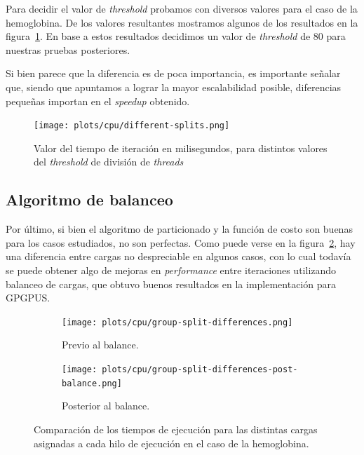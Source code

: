Para decidir el valor de \textit{threshold} probamos con diversos valores para
el caso de la hemoglobina. De los valores resultantes mostramos algunos de los
resultados en la figura~\ref{fig:split-hemo}. En base a estos resultados decidimos
un valor de \textit{threshold} de 80 para nuestras pruebas posteriores.

Si bien parece que la diferencia es de poca importancia, es importante se\~nalar
que, siendo que apuntamos a lograr la mayor escalabilidad posible, diferencias
peque\~nas importan en el \textit{speedup} obtenido.

\begin{figure}[htbp]
   \centering
   \texttt{[image: plots/cpu/different-splits.png]}
   \caption{Valor del tiempo de iteraci\'on en milisegundos, para distintos
   valores del \textit{threshold} de divisi\'on de \textit{threads}}
   \label{fig:split-hemo}
\end{figure}

\subsection{Algoritmo de balanceo}

Por \'ultimo, si bien el algoritmo de particionado y la funci\'on de costo son
buenas para los casos estudiados, no son perfectas. Como puede verse en la
figura~\ref{fig:lio-imbalance-between-loads}, hay una diferencia entre cargas
no despreciable en algunos casos, con lo cual todav\'ia se puede obtener algo de
mejoras en \textit{performance} entre iteraciones utilizando balanceo de cargas,
que obtuvo buenos resultados en la implementaci\'on para GPGPUS.

\begin{figure}[htbp]
   \centering
   \begin{subfigure}[b]{\plotwidthtres}
     \texttt{[image: plots/cpu/group-split-differences.png]}
     \caption{Previo al balance.}
     \label{fig:lio-imbalance-between-loads}
   \end{subfigure}
   \begin{subfigure}[b]{\plotwidthtres}
     \texttt{[image: plots/cpu/group-split-differences-post-balance.png]}
     \caption{Posterior al balance.}
     \label{fig:lio-imbalance-fixed}
   \end{subfigure}
   \caption{Comparaci\'on de los tiempos de ejecuci\'on para las distintas
   cargas asignadas a cada hilo de ejecuci\'on en el caso de la hemoglobina.}
   \label{fig:lio-imbalance}
\end{figure}

